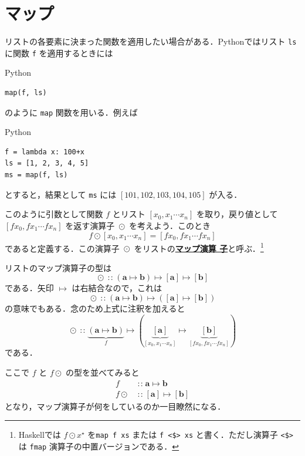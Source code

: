 \documentclass[a5paper,twoside,fleqn,draft]{jsbook}
\newcommand{\programminglanguage}[1]{\textsf{#1}}
\newcommand{\haskell}{\programminglanguage{Haskell}}
\newcommand{\python}{\programminglanguage{Python}}
\newcommand{\keyword}[1]{{\underline{\textbf{#1}}}}
\newcommand{\code}[1]{\texttt{#1}}
\newenvironment{pythoncode}{\begin{itembox}[r]{\python}}{\end{itembox}}
\DeclareMathOperator{\mFuncArrow}{\mapsto}
\DeclareMathOperator{\mIn}{{:\!:}}
\DeclareMathOperator{\mMapList}{\odot}
\newcommand{\mType}[1]{\mathbf{#1}} %
\newcommand{\mA}{\mType{a}}
\newcommand{\mB}{\mType{b}}
\newcommand{\mList}[1]{{#1}^\mathrm{\star}}
\begin{document}
\section{マップ}

リストの各要素に決まった関数を適用したい場合がある．\python ではリスト
\code{ls} に関数 \code{f} を適用するときには
\begin{pythoncode}
\begin{verbatim}
map(f, ls)
\end{verbatim}
\end{pythoncode}
のように \code{map} 関数を用いる．例えば
\begin{pythoncode}
\begin{verbatim}
f = lambda x: 100+x
ls = [1, 2, 3, 4, 5]
ms = map(f, ls)
\end{verbatim}
\end{pythoncode}
とすると，結果として \code{ms} には $[101,102,103,104,105]$
が入る．

このように引数として関数 $f$ とリスト $[x_0,x_1\dotsb x_n]$
を取り，戻り値として $[fx_0,fx_1\dotsb fx_n]$ を返す演算子
$\mMapList$ を考えよう．このとき
\begin{equation}
  f\mMapList[x_0,x_1\dotsb x_n]
  =[fx_0,fx_1\dotsb fx_n]
\end{equation}
であると定義する．この演算子 $\mMapList$ をリストの\keyword{マップ演算
  子}と呼ぶ．\footnote{\haskell では $f\mMapList\mList{x}$ を\code{map
    f xs} または \code{f <\$> xs} と書く．ただし演算子 \code{<\$>} は
  \code{fmap} 演算子の中置バージョンである．}

リストのマップ演算子の型は
\begin{equation}
  \mMapList
  \mIn{}(\mA\mFuncArrow\mB)\mFuncArrow[\mA]\mFuncArrow[\mB]
\end{equation}
である．矢印 $\mFuncArrow$ は右結合なので，これは
\begin{equation}
  \mMapList
  \mIn{}(\mA\mFuncArrow\mB)\mFuncArrow([\mA]\mFuncArrow[\mB])
\end{equation}
の意味でもある．念のため上式に注釈を加えると
\begin{equation}
  \mMapList
  \mIn\underbrace{\left(\mA\mFuncArrow\mB\right)}_f
  \mFuncArrow\left(\underbrace{[\mA]}_{[x_0,x_1\dotsb x_n]}
  \mFuncArrow\underbrace{[\mB]}_{[fx_0,fx_1\dotsb fx_n]}\right)
\end{equation}
である．

ここで $f$ と $f\mMapList$ の型を並べてみると
\begin{align}
  f
  &\mIn\mA\mFuncArrow\mB\\
  f\mMapList
  &\mIn{}[\mA]\mFuncArrow[\mB]
\end{align}
となり，マップ演算子が何をしているのか一目瞭然になる．
\end{document}
